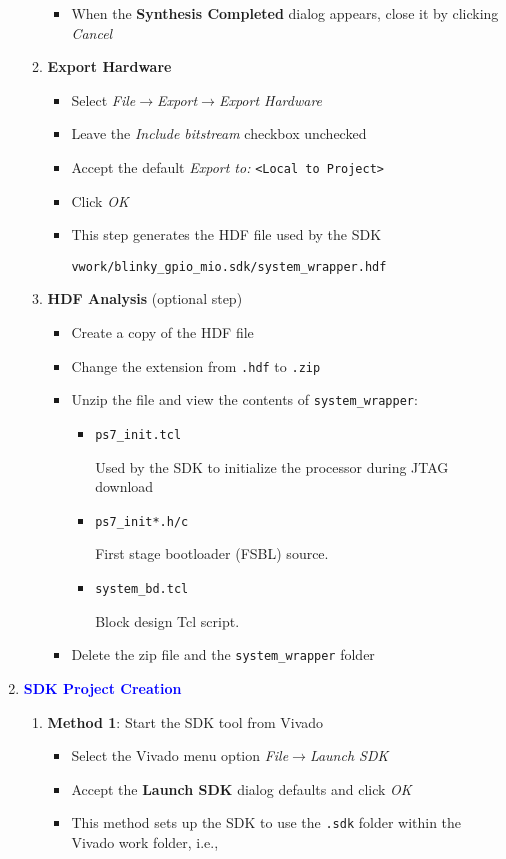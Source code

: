 \begin{enumerate}
\begin{enumerate}
\begin{itemize}
\item When the {\bf Synthesis Completed} dialog appears, close it
by clicking \emph{Cancel}
\end{itemize}
%
\item {\bf Export Hardware}
%
\begin{itemize}
\item Select \emph{File}$\rightarrow$\emph{Export}$\rightarrow$\emph{Export Hardware}
\item Leave the \emph{Include bitstream} checkbox unchecked
\item Accept the default \emph{Export to:} \verb+<Local to Project>+
\item Click \emph{OK}
\item This step generates the HDF file used by the SDK
%
\begin{verbatim}
vwork/blinky_gpio_mio.sdk/system_wrapper.hdf
\end{verbatim}
\end{itemize}
%
\newpage
\item {\bf HDF Analysis} (optional step)
%
\begin{itemize}
\item Create a copy of the HDF file
\item Change the extension from \verb+.hdf+ to \verb+.zip+
\item Unzip the file and view the contents of \verb+system_wrapper+:
\begin{itemize}
\item \verb+ps7_init.tcl+

Used by the SDK to initialize the processor during JTAG download

\item \verb+ps7_init*.h/c+

First stage bootloader (FSBL) source.

\item \verb+system_bd.tcl+

Block design Tcl script.
\end{itemize}
\item Delete the zip file and the \verb+system_wrapper+ folder
\end{itemize}
%
\end{enumerate}
%
\item \textcolor{blue}{\textbf{SDK Project Creation}}
%
\begin{enumerate}
\item \textbf{Method 1}: Start the SDK tool from Vivado
%
\begin{itemize}
\item Select the Vivado menu option \emph{File}$\rightarrow$\emph{Launch SDK}
\item Accept the {\bf Launch SDK} dialog defaults and click \emph{OK}
\item This method sets up the SDK to use the \verb+.sdk+ folder within the
Vivado work folder, i.e.,


\end{itemize}
\end{enumerate}
\end{enumerate}
